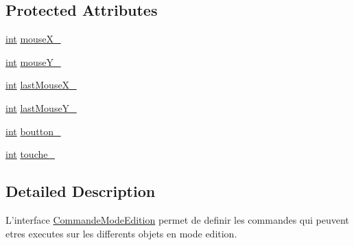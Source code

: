 \subsection*{Protected Attributes}
\begin{DoxyCompactItemize}
\item 
\hyperlink{wglew_8h_a500a82aecba06f4550f6849b8099ca21}{int} \hyperlink{class_commande_mode_edition_ade7653be98ae5dd9da895a34983ec680}{mouse\-X\-\_\-}
\item 
\hyperlink{wglew_8h_a500a82aecba06f4550f6849b8099ca21}{int} \hyperlink{class_commande_mode_edition_a6128370123ce4b6e6fb8571c953241e4}{mouse\-Y\-\_\-}
\item 
\hyperlink{wglew_8h_a500a82aecba06f4550f6849b8099ca21}{int} \hyperlink{class_commande_mode_edition_a02fd21f564101674d5c8af535322ea02}{last\-Mouse\-X\-\_\-}
\item 
\hyperlink{wglew_8h_a500a82aecba06f4550f6849b8099ca21}{int} \hyperlink{class_commande_mode_edition_a42bd29db98adec623e8c7cd5771783f3}{last\-Mouse\-Y\-\_\-}
\item 
\hyperlink{wglew_8h_a500a82aecba06f4550f6849b8099ca21}{int} \hyperlink{class_commande_mode_edition_a84e2d980201bc0649b2af9c9f4bff7e6}{boutton\-\_\-}
\item 
\hyperlink{wglew_8h_a500a82aecba06f4550f6849b8099ca21}{int} \hyperlink{class_commande_mode_edition_a3a522c03034a54eb01178e8c8af9a8db}{touche\-\_\-}
\end{DoxyCompactItemize}


\subsection{Detailed Description}
L'interface \hyperlink{class_commande_mode_edition}{Commande\-Mode\-Edition} permet de definir les commandes qui peuvent etres executes sur les differents objets en mode edition. 

